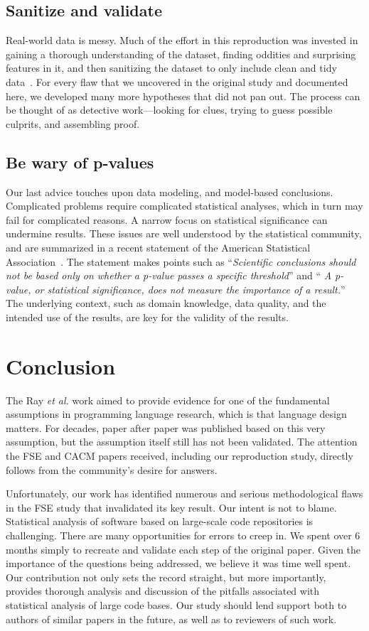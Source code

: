 \documentclass[acmsmall]{acmart}
\newcommand{\ea}{\emph{et al.}\xspace}
\begin{document}
\subsection{Sanitize and validate} Real-world data is messy.
Much of the effort in this reproduction was invested in gaining a thorough
understanding of the dataset, finding oddities and surprising features in
it, and then sanitizing the dataset to only include clean and tidy
data~\cite{hadley}. For every flaw that we uncovered in the original study
and documented here, we developed many more hypotheses that did not pan out.
The process can be thought of as detective work---looking for clues, trying
to guess possible culprits, and assembling proof.

\subsection{Be wary of  p-values}
Our last advice touches upon data modeling, and model-based
conclusions. Complicated problems require complicated statistical analyses,
which in turn may fail for complicated reasons. A narrow focus on
statistical significance can undermine results. These issues are well
understood by the statistical community, and are summarized in a recent
statement of the American Statistical Association~\cite{lazar}. The
statement makes points such as ``{\it Scientific conclusions should not be
  based only on whether a p-value passes a specific threshold}'' and ``{\it
  A p-value, or statistical significance, does not measure the importance of
  a result.}''  The underlying context, such as domain knowledge, data
quality, and the intended use of the results, are key for the validity of
the results.


\section{Conclusion}

The Ray \ea work aimed to provide evidence for one of the fundamental
assumptions in programming language research, which is that language design
matters. For decades, paper after paper was published based on this very
assumption, but the assumption itself still has not been validated. The
attention the FSE and CACM papers received, including our reproduction
study, directly follows from the community's desire for answers.

Unfortunately, our work has identified numerous and serious methodological
flaws in the FSE study that invalidated its key result.  Our intent is not
to blame. Statistical analysis of software based on large-scale code
repositories is challenging. There are many opportunities for errors to
creep in. We spent over 6 months simply to recreate and validate each step
of the original paper.  Given the importance of the questions being
addressed, we believe it was time well spent. Our contribution not only sets
the record straight, but more importantly, provides thorough analysis and
discussion of the pitfalls associated with statistical analysis of large
code bases. Our study should lend support both to authors of similar papers
in the future, as well as to reviewers of such work.
\end{document}

